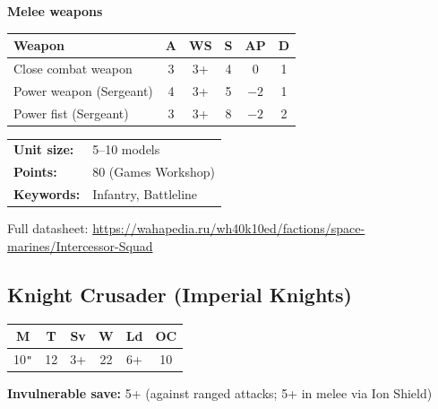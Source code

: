 \documentclass[11pt,a4paper]{article}
\begin{document}
\vspace{2mm}

\textbf{Melee weapons}

\begin{center}
\renewcommand{\arraystretch}{1.2}
\begin{tabular}{l c c c c c}
  \toprule
  \textbf{Weapon} & \textbf{A} & \textbf{WS} & \textbf{S} & \textbf{AP} & \textbf{D} \\
  \midrule
  Close combat weapon & 3 & 3+ & 4 & 0 & 1 \\
  Power weapon (Sergeant) & 4 & 3+ & 5 & $-2$ & 1 \\
  Power fist (Sergeant) & 3 & 3+ & 8 & $-2$ & 2 \\
  \bottomrule
\end{tabular}
\end{center}

\vspace{2mm}

\begin{tabular}{@{}ll@{}}
  \textbf{Unit size:} & 5--10 models \\
  \textbf{Points:} & 80 (Games Workshop) \\
  \textbf{Keywords:} & Infantry, Battleline \\
\end{tabular}

\vspace{1mm}
{\small\color{greytext}
Full datasheet: \url{https://wahapedia.ru/wh40k10ed/factions/space-marines/Intercessor-Squad}}

\vspace{8mm}

\subsection{Knight Crusader \normalfont\small(Imperial Knights)}

\begin{center}
\renewcommand{\arraystretch}{1.2}
\begin{tabular}{cccccc}
  \toprule
  \textbf{M} & \textbf{T} & \textbf{Sv} & \textbf{W} & \textbf{Ld} & \textbf{OC} \\
  \midrule
  10\texttt{"} & 12 & 3+ & 22 & 6+ & 10 \\
  \bottomrule
\end{tabular}
\end{center}

\vspace{1mm}
\textbf{Invulnerable save:} 5+ (against ranged attacks; 5+ in melee via Ion Shield)
\end{document}
